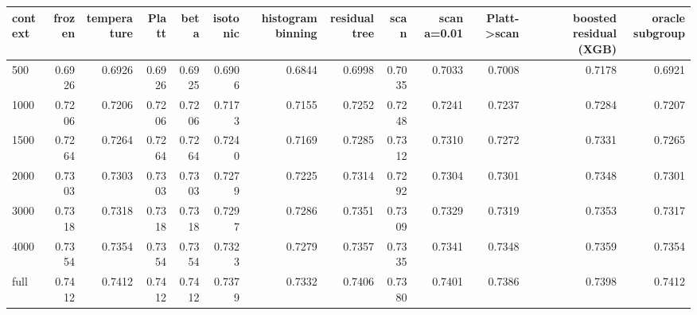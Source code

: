 \begin{tabular}{lrrrrrrrrrrrr}
\toprule
context & frozen & temperature & Platt & beta & isotonic & histogram binning & residual tree & scan & scan a=0.01 & Platt->scan & boosted residual (XGB) & oracle subgroup \\
\midrule
500 & 0.6926 & 0.6926 & 0.6926 & 0.6925 & 0.6906 & 0.6844 & 0.6998 & 0.7035 & 0.7033 & 0.7008 & 0.7178 & 0.6921 \\
1000 & 0.7206 & 0.7206 & 0.7206 & 0.7206 & 0.7173 & 0.7155 & 0.7252 & 0.7248 & 0.7241 & 0.7237 & 0.7284 & 0.7207 \\
1500 & 0.7264 & 0.7264 & 0.7264 & 0.7264 & 0.7240 & 0.7169 & 0.7285 & 0.7312 & 0.7310 & 0.7272 & 0.7331 & 0.7265 \\
2000 & 0.7303 & 0.7303 & 0.7303 & 0.7303 & 0.7279 & 0.7225 & 0.7314 & 0.7292 & 0.7304 & 0.7301 & 0.7348 & 0.7301 \\
3000 & 0.7318 & 0.7318 & 0.7318 & 0.7318 & 0.7297 & 0.7286 & 0.7351 & 0.7309 & 0.7329 & 0.7319 & 0.7353 & 0.7317 \\
4000 & 0.7354 & 0.7354 & 0.7354 & 0.7354 & 0.7323 & 0.7279 & 0.7357 & 0.7335 & 0.7341 & 0.7348 & 0.7359 & 0.7354 \\
full & 0.7412 & 0.7412 & 0.7412 & 0.7412 & 0.7379 & 0.7332 & 0.7406 & 0.7380 & 0.7401 & 0.7386 & 0.7398 & 0.7412 \\
\bottomrule
\end{tabular}
